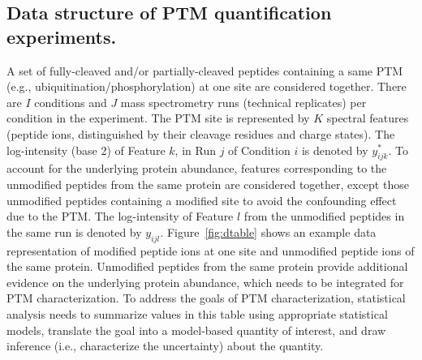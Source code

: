 \documentclass{mcp}
\def\sfigref#1{{Figure~\ref{#1}}}
\begin{document}
\subsection{Data structure of PTM quantification experiments.}
A set of fully-cleaved and/or partially-cleaved peptides containing a same PTM (e.g., ubiquitination/phosphorylation) at one site are considered together. There are $I$ conditions and $J$ mass spectrometry runs (technical replicates) per condition in the experiment. The PTM site is represented by $K$ spectral features (peptide ions, distinguished by their cleavage residues and charge states). The log-intensity (base 2) of Feature $k$, in Run $j$ of Condition $i$ is denoted by $y_{ijk}^{\ast}$. To account for the underlying protein abundance, features corresponding to the unmodified peptides from the same protein are considered together, except those unmodified peptides containing a modified site to avoid the confounding effect due to the PTM. The log-intensity of Feature $l$ from the unmodified peptides in the same run is denoted by $y_{ijl}$. \sfigref{fig:dtable} shows an example data representation of modified peptide ions at one site and unmodified peptide ions of the same protein. Unmodified peptides from the same protein provide additional evidence on the underlying protein abundance, which needs to be integrated for PTM characterization. To address the goals of PTM characterization, statistical analysis needs to summarize values in this table using appropriate statistical models, translate the goal into a model-based quantity of interest, and draw inference (i.e., characterize the uncertainty) about the quantity. 
\end{document}
